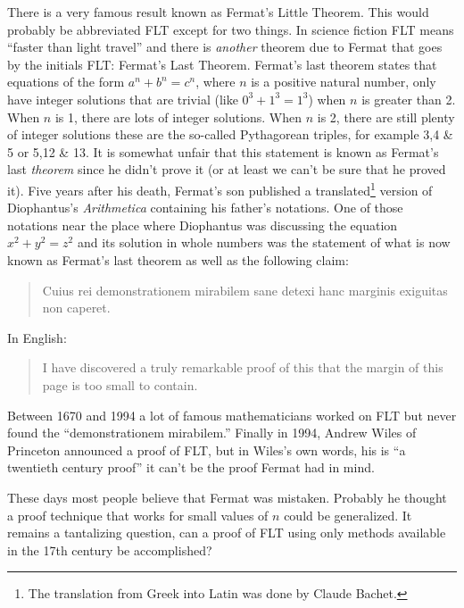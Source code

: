 \documentclass[10pt,]{book}
\theoremstyle{plain}
\theoremstyle{definition}
\theoremstyle{definition}
\numberwithin{equation}{section}
\begin{document}
    There is a very famous result known as
    Fermat's Little Theorem.
    This would probably be abbreviated FLT except for two things.
    In science fiction FLT means ``faster than light travel'' and
    there is \emph{another} theorem due to Fermat that goes by
    the initials FLT: Fermat's Last Theorem.
    Fermat's last theorem states that equations of the form \(a^n+b^n=c^n\),
    where \(n\) is a positive natural number,
    only have integer solutions that are trivial (like \(0^3+1^3=1^3\)) when \(n\)
    is greater than 2. When \(n\) is 1, there are lots of integer solutions.
    When \(n\) is 2, there are still plenty of integer solutions \textemdash{} these are the
    so-called Pythagorean triples, for example 3,4 \& 5 or 5,12 \& 13.
    It is somewhat unfair that this statement is known as Fermat's last \emph{theorem} since he didn't prove it (or at least we can't be sure that he proved it).
    Five years after his death, Fermat's son published a translated\footnote{The
    translation from Greek into Latin was done by Claude Bachet.\label{fn-35}} version of
    Diophantus's \emph{Arithmetica} containing his father's notations. One of
    those notations \textemdash{} near the place where Diophantus was discussing the
    equation \(x^2+y^2=z^2\) and its solution in whole numbers \textemdash{} was the statement
    of what is now known as Fermat's last theorem as well as the following claim:
\begin{quote}
  Cuius rei demonstrationem mirabilem sane detexi hanc marginis exiguitas non caperet.
  \end{quote}
\par

    In English:
\begin{quote}
  I have discovered a truly remarkable proof of this that the margin of this page is too small to contain.
  \end{quote}
\par

    Between 1670 and 1994 a lot of famous mathematicians worked on FLT but
    never found the ``demonstrationem mirabilem.'' Finally in 1994, Andrew Wiles
    of Princeton announced a proof of FLT, but in Wiles's own words, his is ``a twentieth century proof'' it can't be the proof Fermat had in mind.
\par

    These days most people believe that Fermat was mistaken. Probably he thought
    a proof technique that works for small values of \(n\) could be generalized.
    It remains a tantalizing question, can a proof of FLT using only methods
    available in the 17th century be accomplished?
\par
\end{document}
